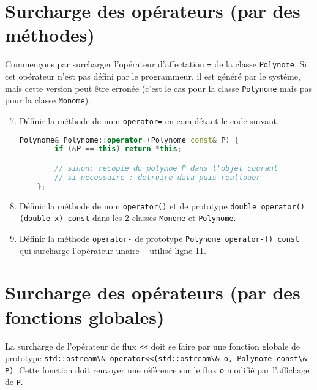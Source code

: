\documentclass[a4paper,14pt]{article}
\begin{document}
\section*{Surcharge des opérateurs (par des méthodes)}

Commençons par surcharger l'opérateur d'affectation \texttt{=} de la classe \texttt{Polynome}. Si cet opérateur n'est pas défini par le programmeur, il est généré par le systéme, mais cette version peut être erronée (c'est le cas pour la classe \texttt{Polynome} mais pas pour la classe \texttt{Monome}).

\begin{enumerate}
    \setcounter{enumi}{6}
    \item Définir la méthode de nom \texttt{operator=} en complétant le code suivant.
    
    \begin{lstlisting}[language=C++]
    Polynome& Polynome::operator=(Polynome const& P) {
        if (&P == this) return *this;

        // sinon: recopie du polymoe P dans l'objet courant
        // si necessaire : detruire data puis reallouer
    };
    \end{lstlisting}

    \item Définir la méthode de nom \texttt{operator()} et de prototype \texttt{double operator()(double x) const} dans les 2 classes \texttt{Monome} et \texttt{Polynome}.
    
    \item Définir la méthode \texttt{operator-} de prototype \texttt{Polynome operator-() const} qui surcharge l'opérateur unaire \texttt{-} utilisé ligne 11.
\end{enumerate}

\section*{Surcharge des opérateurs (par des fonctions globales)}

La surcharge de l'opérateur de flux \texttt{<<} doit se faire par une fonction globale de prototype \verb|std::ostream\& operator<<(std::ostream\& o, Polynome const\& P)|. Cette fonction doit renvoyer une référence sur le flux \verb|o| modifié par l'affichage de \verb|P|.
\end{document}
